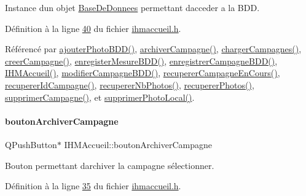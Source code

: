 Instance d\textquotesingle{}un objet \hyperlink{class_base_de_donnees}{Base\+De\+Donnees} permettant d\textquotesingle{}acceder a la B\+DD. 



Définition à la ligne \hyperlink{ihmaccueil_8h_source_l00040}{40} du fichier \hyperlink{ihmaccueil_8h_source}{ihmaccueil.\+h}.



Référencé par \hyperlink{ihmaccueil_8cpp_source_l00313}{ajouter\+Photo\+B\+D\+D()}, \hyperlink{ihmaccueil_8cpp_source_l00350}{archiver\+Campagne()}, \hyperlink{ihmaccueil_8cpp_source_l00130}{charger\+Campagnes()}, \hyperlink{ihmaccueil_8cpp_source_l00339}{creer\+Campagne()}, \hyperlink{ihmaccueil_8cpp_source_l00404}{enregister\+Mesure\+B\+D\+D()}, \hyperlink{ihmaccueil_8cpp_source_l00273}{enregistrer\+Campagne\+B\+D\+D()}, \hyperlink{ihmaccueil_8cpp_source_l00014}{I\+H\+M\+Accueil()}, \hyperlink{ihmaccueil_8cpp_source_l00295}{modifier\+Campagne\+B\+D\+D()}, \hyperlink{ihmaccueil_8cpp_source_l00120}{recuperer\+Campagne\+En\+Cours()}, \hyperlink{ihmaccueil_8cpp_source_l00205}{recuperer\+Id\+Campagne()}, \hyperlink{ihmaccueil_8cpp_source_l00115}{recuperer\+Nb\+Photos()}, \hyperlink{ihmaccueil_8cpp_source_l00125}{recuperer\+Photos()}, \hyperlink{ihmaccueil_8cpp_source_l00375}{supprimer\+Campagne()}, et \hyperlink{ihmaccueil_8cpp_source_l00224}{supprimer\+Photo\+Local()}.

\mbox{\label{class_i_h_m_accueil_a96d64cf254c0645eb45c317858b0a0f3}} 
\paragraph{\texorpdfstring{bouton\+Archiver\+Campagne}{boutonArchiverCampagne}}
{\footnotesize\ttfamily Q\+Push\+Button$\ast$ I\+H\+M\+Accueil\+::bouton\+Archiver\+Campagne\hspace{0.3cm}{\ttfamily [private]}}



Bouton permettant d\textquotesingle{}archiver la campagne sélectionner. 



Définition à la ligne \hyperlink{ihmaccueil_8h_source_l00035}{35} du fichier \hyperlink{ihmaccueil_8h_source}{ihmaccueil.\+h}.



